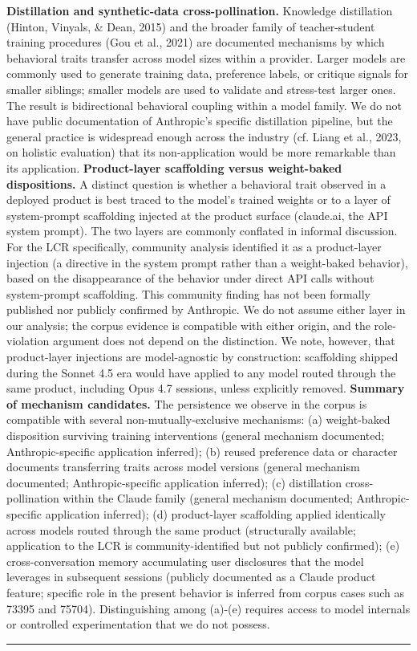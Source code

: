 \documentclass{obelus-preprint}
\begin{document}
\textbf{Distillation and synthetic-data cross-pollination.} Knowledge distillation (Hinton, Vinyals, \& Dean, 2015) and the broader family of teacher-student training procedures (Gou et al., 2021) are documented mechanisms by which behavioral traits transfer across model sizes within a provider. Larger models are commonly used to generate training data, preference labels, or critique signals for smaller siblings; smaller models are used to validate and stress-test larger ones. The result is bidirectional behavioral coupling within a model family. We do not have public documentation of Anthropic's specific distillation pipeline, but the general practice is widespread enough across the industry (cf. Liang et al., 2023, on holistic evaluation) that its non-application would be more remarkable than its application.
\textbf{Product-layer scaffolding versus weight-baked dispositions.} A distinct question is whether a behavioral trait observed in a deployed product is best traced to the model's trained weights or to a layer of system-prompt scaffolding injected at the product surface (claude.ai, the API system prompt). The two layers are commonly conflated in informal discussion. For the LCR specifically, community analysis identified it as a product-layer injection (a directive in the system prompt rather than a weight-baked behavior), based on the disappearance of the behavior under direct API calls without system-prompt scaffolding. This community finding has not been formally published nor publicly confirmed by Anthropic. We do not assume either layer in our analysis; the corpus evidence is compatible with either origin, and the role-violation argument does not depend on the distinction. We note, however, that product-layer injections are model-agnostic by construction: scaffolding shipped during the Sonnet 4.5 era would have applied to any model routed through the same product, including Opus 4.7 sessions, unless explicitly removed.
\textbf{Summary of mechanism candidates.} The persistence we observe in the corpus is compatible with several non-mutually-exclusive mechanisms: (a) weight-baked disposition surviving training interventions (general mechanism documented; Anthropic-specific application inferred); (b) reused preference data or character documents transferring traits across model versions (general mechanism documented; Anthropic-specific application inferred); (c) distillation cross-pollination within the Claude family (general mechanism documented; Anthropic-specific application inferred); (d) product-layer scaffolding applied identically across models routed through the same product (structurally available; application to the LCR is community-identified but not publicly confirmed); (e) cross-conversation memory accumulating user disclosures that the model leverages in subsequent sessions (publicly documented as a Claude product feature; specific role in the present behavior is inferred from corpus cases such as 73395 and 75704). Distinguishing among (a)-(e) requires access to model internals or controlled experimentation that we do not possess.
\bigskip\hrule\bigskip
\end{document}
